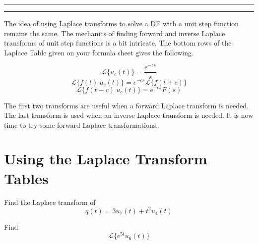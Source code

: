\documentclass[12pt]{article}
\newcommand{\<}{\langle}
\renewcommand{\>}{\rangle}
\begin{document}
	\noindent\rule{7in}{0.4pt}

	\medskip

	{}

	\noindent\rule{7in}{0.4pt}
	
	\medskip

    The idea of using Laplace transforms to solve a DE with a unit step function remains the same.   The mechanics of finding forward and inverse Laplace transforms of unit step functions is a bit intricate.   The bottom rows of the Laplace Table given on your formula sheet gives the following.



    \[\mathscr{L} \{u_c(t)\} = \frac{e^{-cs}}{s} \]
    \[\mathscr{L} \{f(t)\ u_c(t)\} = e^{-cs} \mathscr{L} \{f(t+c)\}  \]
    \[\mathscr{L} \{f(t-c)\ u_c(t)\} = e^{-cs} F(s)  \]

    The first two transforms are useful when a forward Laplace transform is needed.   The last transform is used when an inverse Laplace transform is needed.  It is now time to try some forward Laplace transformations.


    \section*{Using the Laplace Transform Tables}

      Find the Laplace transform of  \[ q(t)=3u_7(t)+t^2u_4(t) \]

    \newpage

      Find \[ \mathscr{L} \{ e^{5t}u_6(t) \} \] \\
    \vfill
\end{document}
